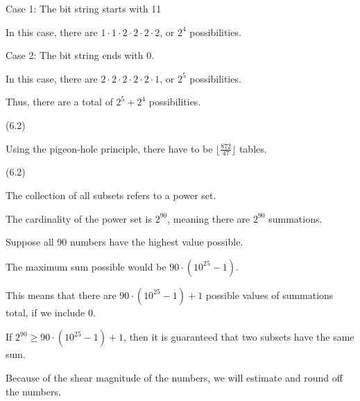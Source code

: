 \documentclass{exam}
\begin{document}
\begin{questions}
\begin{center}

Case 1: The bit string starts with 11

In this case, there are \(1 \cdot 1 \cdot 2 \cdot 2 \cdot 2 \cdot 2\), or \(2^4\) possibilities.
\vspace{5px}

Case 2: The bit string ends with 0.

In this case, there are \(2 \cdot 2 \cdot 2 \cdot 2 \cdot 2 \cdot 1\), or \(2^5\) possibilities.

\vspace{5px}

Thus, there are a total of \(2^5 + 2^4\) possibilities.

\end{center}

 (6.2)

\begin{center}

Using the pigeon-hole principle, there have to be \(\lfloor \frac{872}{47} \rfloor \) tables.

\end{center}

 (6.2)

\begin{center}

The collection of all subsets refers to a power set.

The cardinality of the power set is \(2^{90}\), meaning there are \(2^{90}\) summations.

Suppose all 90 numbers have the highest value possible.

The maximum sum possible would be \(90 \cdot (10^{25}-1)\).

This means that there are \(90 \cdot (10^{25} - 1) +1\) possible values of summations total, if we include 0.

If \(2^{90} \geq 90 \cdot (10^{25} - 1) + 1\), then it is guaranteed that two subsets have the same sum.

Because of the shear magnitude of the numbers, we will estimate and round off the numbers.


\end{center}
\end{questions}
\end{document}
